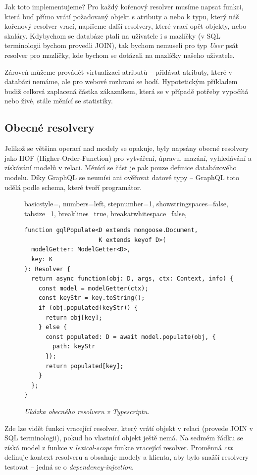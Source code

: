 Jak toto implementujeme? Pro každý kořenový resolver musíme napsat funkci, která buď přímo vrátí požadovaný objekt s atributy a nebo
k typu, který náš kořenový resolver vrací, napíšeme další resolvery, které vrací opět objekty, nebo skaláry.
Kdybychom se databáze ptali na uživatele i s
mazlíčky (v SQL terminologii bychom provedli JOIN), tak bychom nemuseli pro typ \textit{User} psát resolver pro mazlíčky, kde bychom
se dotázali na mazlíčky našeho uživatele.
\citep[viz][]{GraphQLDoc}

Zároveň můžeme provádět virtualizaci atributů -- přidávat atributy, které v databázi nemáme, ale pro webové rozhraní se hodí.
Hypotetickým příkladem budiž celková zaplacená částka zákazníkem, která se v případě potřeby vypočítá nebo
živé, stále měnící se statistiky.

\subsection{Obecné resolvery}

\noindent
Jelikož se většina operací nad modely se opakuje, byly napsány obecné resolvery jako HOF (Higher-Order-Function)
pro vytváření, úpravu, mazání, vyhledávání a získávání modelů v relaci.
Měnící se část je pak pouze definice databázového modelu. Díky GraphQL se neumísi ani ověřovat datové typy --
GraphQL toto udělá podle schema, které tvoří programátor.

\begin{figure}[!htb]
\lstset
{ %
    basicstyle=\footnotesize,
    numbers=left,
    stepnumber=1,
    showstringspaces=false,
    tabsize=1,
    breaklines=true,
    breakatwhitespace=false,
}
\begin{lstlisting}
function gqlPopulate<D extends mongoose.Document,
                     K extends keyof D>(
  modelGetter: ModelGetter<D>,
  key: K
): Resolver {
  return async function(obj: D, args, ctx: Context, info) {
    const model = modelGetter(ctx);
    const keyStr = key.toString();
    if (obj.populated(keyStr)) {
      return obj[key];
    } else {
      const populated: D = await model.populate(obj, {
        path: keyStr
      });
      return populated[key];
    }
  };
}
\end{lstlisting}
\centering
\textit{Ukázka obecného resolveru v Typescriptu.}
\end{figure}

Zde lze vidět funkci vracející resolver, který vrátí objekt v relaci (provede JOIN v SQL terminologii),
pokud ho vlastnící objekt ještě nemá. Na sedmém řádku se získá model z funkce v \textit{lexical-scope} funkce
vracející resolver. Proměnná \textit{ctx} definuje kontext resolveru a obsahuje modely a klienta, aby
bylo snažší resolvery testovat -- jedná se o \textit{dependency-injection}.

